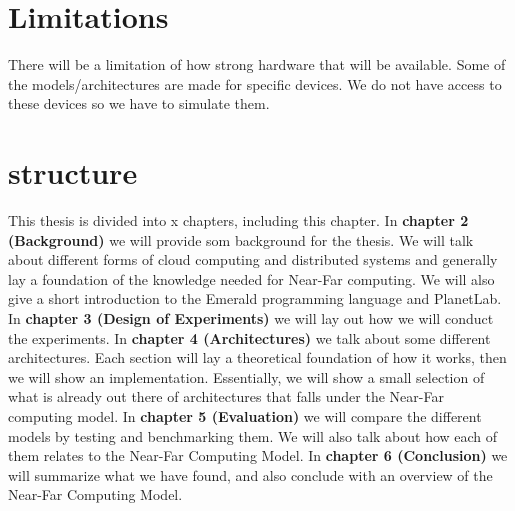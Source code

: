 \section{Limitations}
There will be a limitation of how strong hardware that will be available. Some of the models/architectures are made for specific devices. We do not have access to these devices so we have to simulate them.


\section{structure}
This thesis is divided into x chapters, including this chapter. 
In \textbf{chapter 2 (Background)} we will provide som background for the thesis. We will talk about different forms of cloud computing and distributed systems and generally lay a foundation of the knowledge needed for Near-Far computing. We will also give a short introduction to the Emerald programming language and PlanetLab.
In \textbf{chapter 3 (Design of Experiments)} we will lay out how we will conduct the experiments.
In \textbf{chapter 4 (Architectures)} we talk about some different architectures. Each section will lay a theoretical foundation of how it works, then we will show an implementation. Essentially, we will show a small selection of what is already out there of architectures that falls under the Near-Far computing model.
In \textbf{chapter 5 (Evaluation)} we will compare the different models by testing and benchmarking them. We will also talk about how each of them relates to the Near-Far Computing Model.
In \textbf{chapter 6 (Conclusion)} we will summarize what we have found, and also conclude with an overview of the Near-Far Computing Model.

